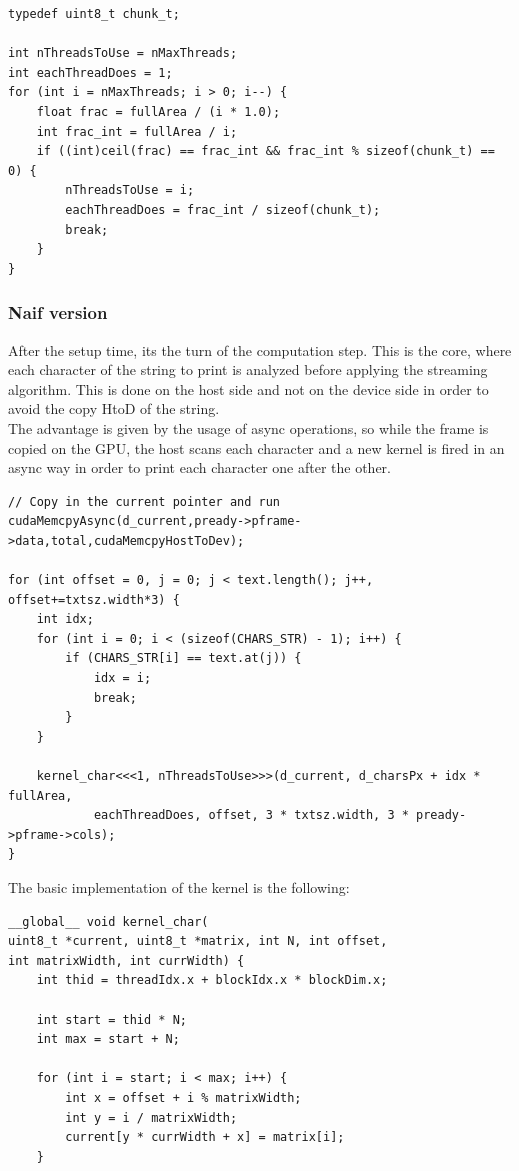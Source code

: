 \documentclass[paper=a4, fontsize=10pt]{scrartcl}	%
\begin{document}
	\begin{lstlisting}[style=CStyle]
typedef uint8_t chunk_t;

int nThreadsToUse = nMaxThreads;
int eachThreadDoes = 1;
for (int i = nMaxThreads; i > 0; i--) {
	float frac = fullArea / (i * 1.0);
	int frac_int = fullArea / i;
	if ((int)ceil(frac) == frac_int && frac_int % sizeof(chunk_t) == 0) {
		nThreadsToUse = i;
		eachThreadDoes = frac_int / sizeof(chunk_t);
		break;
	}
}
\end{lstlisting}

\subsubsection{Naif version}

After the setup time, its the turn of the computation step. This is the core, where each character of the string to print is analyzed before applying the streaming algorithm. This is done on the host side and not on the device side in order to avoid the copy HtoD of the string.\\

The advantage is given by the usage of async operations, so while the frame is copied on the GPU, the host scans each character and a new kernel is fired in an async way in order to print each character one after the other.

	\begin{lstlisting}[style=CStyle]
// Copy in the current pointer and run 
cudaMemcpyAsync(d_current,pready->pframe->data,total,cudaMemcpyHostToDev);

for (int offset = 0, j = 0; j < text.length(); j++, offset+=txtsz.width*3) {
	int idx;
	for (int i = 0; i < (sizeof(CHARS_STR) - 1); i++) {
		if (CHARS_STR[i] == text.at(j)) {
			idx = i;
			break;
		}
	}

	kernel_char<<<1, nThreadsToUse>>>(d_current, d_charsPx + idx * fullArea,
			eachThreadDoes, offset, 3 * txtsz.width, 3 * pready->pframe->cols);
}
\end{lstlisting}

The basic implementation of the kernel is the following:

	\begin{lstlisting}[style=CStyle]
__global__ void kernel_char(
uint8_t *current, uint8_t *matrix, int N, int offset, 
int matrixWidth, int currWidth) {
    int thid = threadIdx.x + blockIdx.x * blockDim.x;

    int start = thid * N;
    int max = start + N;

    for (int i = start; i < max; i++) {
        int x = offset + i % matrixWidth;
        int y = i / matrixWidth;
        current[y * currWidth + x] = matrix[i];
    } 
	\end{lstlisting}
\end{document}
